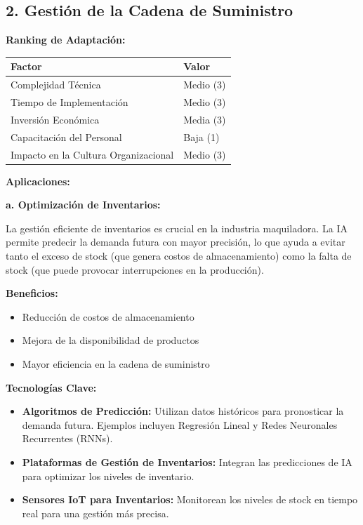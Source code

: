 \documentclass[
  10pt,
  letterpaper,
]{book}
\providecommand{\tightlist}{%
  \setlength{\itemsep}{0pt}\setlength{\parskip}{0pt}}\usepackage{longtable,booktabs,array}
\begin{document}
\subsection{2. Gestión de la Cadena de
Suministro}\label{gestiuxf3n-de-la-cadena-de-suministro}

\textbf{Ranking de Adaptación:}

\begin{longtable}[]{@{}ll@{}}
\toprule\noalign{}
Factor & Valor \\
\midrule\noalign{}
\endhead
\bottomrule\noalign{}
\endlastfoot
Complejidad Técnica & Medio (3) \\
Tiempo de Implementación & Medio (3) \\
Inversión Económica & Media (3) \\
Capacitación del Personal & Baja (1) \\
Impacto en la Cultura Organizacional & Medio (3) \\
\end{longtable}

\textbf{Aplicaciones:}

\textbf{a. Optimización de Inventarios:}

La gestión eficiente de inventarios es crucial en la industria
maquiladora. La IA permite predecir la demanda futura con mayor
precisión, lo que ayuda a evitar tanto el exceso de stock (que genera
costos de almacenamiento) como la falta de stock (que puede provocar
interrupciones en la producción).

\textbf{Beneficios:}

\begin{itemize}
\tightlist
\item
  Reducción de costos de almacenamiento
\item
  Mejora de la disponibilidad de productos
\item
  Mayor eficiencia en la cadena de suministro
\end{itemize}

\textbf{Tecnologías Clave:}

\begin{itemize}
\tightlist
\item
  \textbf{Algoritmos de Predicción:} Utilizan datos históricos para
  pronosticar la demanda futura. Ejemplos incluyen Regresión Lineal y
  Redes Neuronales Recurrentes (RNNs).
\item
  \textbf{Plataformas de Gestión de Inventarios:} Integran las
  predicciones de IA para optimizar los niveles de inventario.
\item
  \textbf{Sensores IoT para Inventarios:} Monitorean los niveles de
  stock en tiempo real para una gestión más precisa.
\end{itemize}
\end{document}
